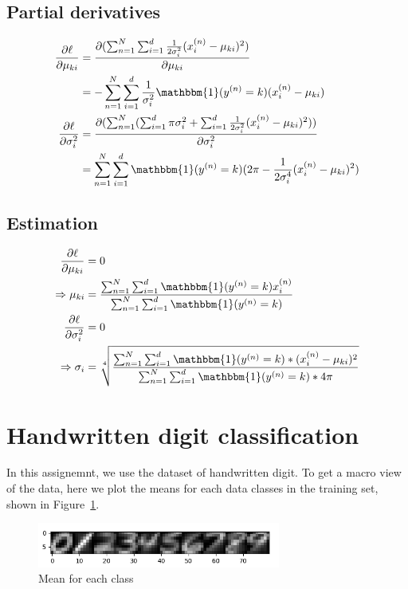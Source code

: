 \documentclass[a4paper]{article}
\begin{document}
\subsection{Partial derivatives}

\begin{align*}
    \frac{\partial \ell}{\partial \mu_{ki}}&=\frac{\partial(\sum^N_{n=1}\sum^d_{i=1}\frac{1}{2\sigma^2_i}(x^{(n)}_i-\mu_{ki})^2)}{\partial \mu_{ki}}\\
    &=-\sum^N_{n=1}\sum^d_{i=1}\frac{1}{\sigma^2_i}\mathbbm{1}(y^{(n)}=k)(x^{(n)}_i-\mu_{ki})\\
    \frac{\partial \ell}{\partial \sigma_i^2}&=\frac{\partial(\sum^N_{n=1}(\sum^d_{i=1}\pi\sigma^2_i+\sum^d_{i=1}\frac{1}{2\sigma^2_i}(x^{(n)}_i-\mu_{ki})^2))}{\partial \sigma_i^2}\\
    &=\sum^N_{n=1}\sum^d_{i=1}\mathbbm{1}(y^{(n)}=k)(2\pi-\frac{1}{2\sigma^4_i}(x^{(n)}_i-\mu_{ki})^2)
\end{align*}

\subsection{Estimation}

\begin{align*}
    \frac{\partial \ell}{\partial \mu_{ki}}&=0\\
    \Rightarrow\mu_{ki}&=\frac{\sum^N_{n=1}\sum^d_{i=1}\mathbbm{1}(y^{(n)}=k)x^{(n)}_i}{\sum^N_{n=1}\sum^d_{i=1}\mathbbm{1}(y^{(n)}=k)}\\
    \frac{\partial \ell}{\partial \sigma_i^2}&=0\\
    \Rightarrow\sigma_i&=\sqrt[4]{\frac{\sum^N_{n=1}\sum^d_{i=1}\mathbbm{1}(y^{(n)}=k)*(x^{(n)}_i-\mu_{ki})^2}{\sum^N_{n=1}\sum^d_{i=1}\mathbbm{1}(y^{(n)}=k)*4\pi}}
\end{align*}

\section{Handwritten digit classification}

In this assignemnt, we use the dataset of handwritten digit. To get a macro view of the data, here we plot the means for each data classes in the training set, shown in Figure~\ref{fig: Trainging_data_mean}.

\begin{figure}[htbp]
\centering
\includegraphics[width = 8cm]{Trainging_data_mean}
\caption{Mean for each class}
\label{fig: Trainging_data_mean}
\end{figure}
\end{document}

